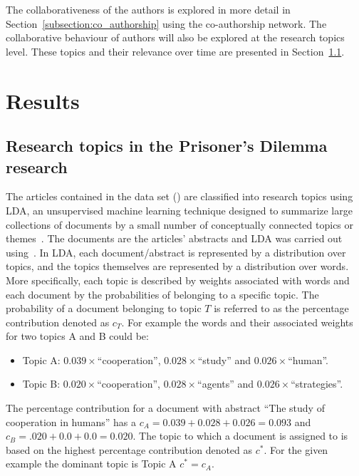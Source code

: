 \documentclass{article}
\theoremstyle{definition}
\begin{document}
The collaborativeness of the authors is explored in more detail in
Section~\ref{subsection:co_authorship} using the co-authorship network. The collaborative
behaviour of authors will also be explored at the research topics level. These topics and their
relevance over time are presented in Section~\ref{subsection:research_topics}.

\section{Results}\label{section:results}

\subsection{Research topics in the Prisoner's Dilemma research}\label{subsection:research_topics}

The articles contained in the data set (\cite{pd_data_2018}) are classified
into research topics using LDA, an unsupervised machine learning technique
designed to summarize large collections of documents by a small number of
conceptually connected topics or themes~\cite{Blei2003, Grimmer2013}. The
documents are the articles' abstracts and LDA was carried out using~\cite{rehurek_lrec}.
In LDA, each document/abstract is represented by a distribution over topics,
and the topics themselves are represented by a distribution over words. More
specifically, each topic is described by weights associated with words and
each document by the probabilities of belonging to a specific topic. The
probability of a document belonging to topic \(T\) is referred to as the percentage
contribution denoted as \(c_T\). For example the words and their associated
weights for two topics A and B could be:

\begin{itemize}
    \item Topic A: \(0.039 \times\)``cooperation'', \(0.028 \times\)``study'' and \(0.026 \times\)``human''.
    \item Topic B: \(0.020 \times\)``cooperation'', \(0.028 \times\)``agents'' and
    \(0.026 \times\)``strategies''.
\end{itemize}

The percentage contribution for a document with abstract ``The study of
cooperation in humans'' has a \(c_{A} = 0.039 + 0.028 + 0.026 = 0.093\) and
\(c_B = .020 + 0.0 + 0.0 = 0.020\). The topic to which a document is assigned to
is based on the highest percentage contribution denoted as \(c^*\). For the
given example the dominant topic is Topic A \(c^*=c_A\).
\end{document}
